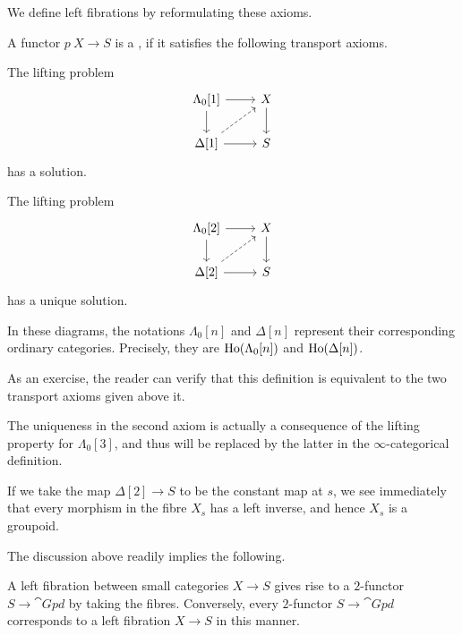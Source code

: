 We define left fibrations by reformulating these axioms.

\begin{definition}
    A functor $p\:X\to S$ is a , if
    it satisfies the following transport axioms.
    \begin{itms}
        \item The lifting problem 
        \[\begin{tikzcd}
            \Lambda_0[1] \ar[d] \ar[r] & X \ar[d] \\
            \Delta[1] \ar[r] \ar[ur,dashed] & S
        \end{tikzcd}\]
        has a solution.
        \item The lifting problem 
        \[\begin{tikzcd}
            \Lambda_0[2] \ar[d] \ar[r] & X \ar[d] \\
            \Delta[2] \ar[r] \ar[ur,dashed] & S
        \end{tikzcd}\]
        has a unique solution.
    \end{itms}
    In these diagrams, the notations $\Lambda_0[n]$ and $\Delta[n]$
    represent their corresponding ordinary categories.
    Precisely, they are $\operatorname{Ho}(\Lambda_0[n])$ and $\operatorname{Ho}(\Delta[n])$.
\end{definition}

As an exercise, the reader can verify that 
this definition is equivalent to the two transport axioms given
above it.

\begin{remark}
    The uniqueness in the second axiom 
    is actually a consequence of the lifting property
    for $\Lambda_0[3]$, and thus will be replaced by the latter
    in the $\infty$-categorical definition. \varqed
\end{remark}

If we take the map $\Delta[2]\to S$ to be the constant map at $s$,
we see immediately that every morphism in the fibre $X_s$
has a left inverse, and hence $X_s$ is a groupoid.

The discussion above readily implies the following.

\begin{theorem}
    A left fibration between small categories $X\to S$
    gives rise to a $2$-functor $S\to\cat{Gpd}$ by taking the fibres.
    Conversely, every $2$-functor $S\to\cat{Gpd}$
    corresponds to a left fibration $X\to S$ in this manner.
\end{theorem}

